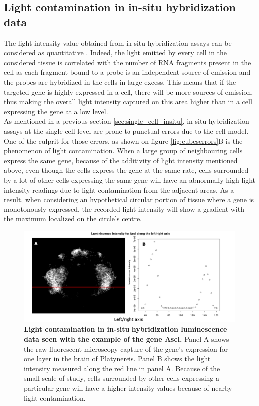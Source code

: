   \subsection{Light contamination in in-situ hybridization data}
  The light intensity value obtained from in-situ hybridization assays can be considered as quantitative \cite{dorresteijn90}. Indeed, the light emitted by every cell in the considered tissue is correlated with the number of RNA fragments present in the cell as each fragment bound to a probe is an independent source of emission and the probes are hybridized in the cells in large excess. This means that if the targeted gene is highly expressed in a cell, there will be more sources of emission, thus making the overall light intensity captured on this area higher than in a cell expressing the gene at a low level. \\
  
  As mentioned in a previous section \ref{sec:single_cell_insitu}, in-situ hybridization assays at the single cell level are prone to punctual errors due to the cell model. One of the culprit for those errors, as shown on figure \ref{fig:cubeserrors}B is the phenomenon of light contamination. When a large group of neighbouring cells express the same gene, because of the additivity of light intensity mentioned above, even though the cells express the gene at the same rate, cells surrounded by a lot of other cells expressing the same gene will have an abnormally high light intensity readings due to light contamination from the adjacent areas. As a result, when considering an hypothetical circular portion of tissue where a gene is monotonously expressed, the recorded light intensity will show a gradient with the maximum localized on the circle's centre.\\
  
   \begin{figure}[h]
\centerline{\includegraphics[width=\linewidth]{gfx/chapter2/whybina.png}}
\caption{{\bf Light contamination in in-situ hybridization luminescence data seen with the example of the gene Ascl.} Panel A shows the raw fluorescent microscopy capture of the gene's expression for one layer in the brain of Platynereis. Panel B shows the light intensity measured along the red line in panel A. Because of the small scale of study, cells surrounded by other cells expressing a particular gene will have a higher intensity values because of nearby light contamination.}\label{fig:why_binarize}
	\end{figure}
  
